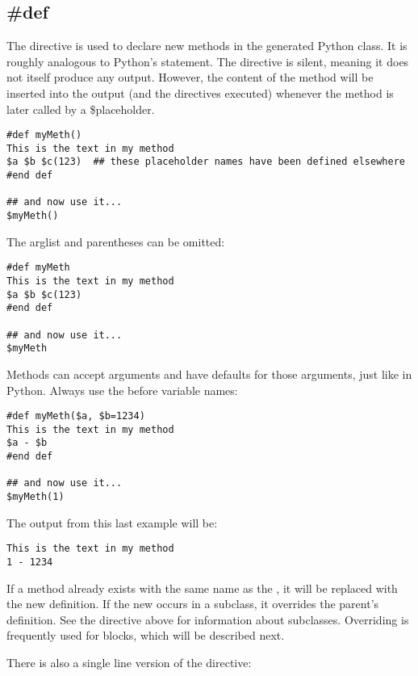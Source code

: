 \subsection{\#def}
\label{inheritanceEtc.def}

The  directive is used to declare new methods in the generated
Python class.  It is roughly analogous to Python's  statement.  
The directive is silent, meaning it does not itself produce any output.
However, the content of the method will be inserted into the output (and the
directives executed) whenever the method is later called by a \$placeholder.

\begin{verbatim}
#def myMeth()
This is the text in my method 
$a $b $c(123)  ## these placeholder names have been defined elsewhere
#end def

## and now use it...
$myMeth()
\end{verbatim}

The arglist and parentheses can be omitted:
\begin{verbatim}
#def myMeth
This is the text in my method 
$a $b $c(123)
#end def

## and now use it...
$myMeth
\end{verbatim}

Methods can accept arguments and have defaults for those arguments, just like
in Python.  Always use the \code{\$} before variable names:
\begin{verbatim}
#def myMeth($a, $b=1234)
This is the text in my method 
$a - $b
#end def

## and now use it...
$myMeth(1)
\end{verbatim}

The output from this last example will be:

\begin{verbatim}
This is the text in my method 
1 - 1234
\end{verbatim}

If a method already exists with the same name as the , it will be
replaced with the new definition.  If the new  occurs in a
subclass, it overrides the parent's definition.  See the 
directive above for information about subclasses.  Overriding is frequently
used for blocks, which will be described next.

There is also a single line version of the  directive:

